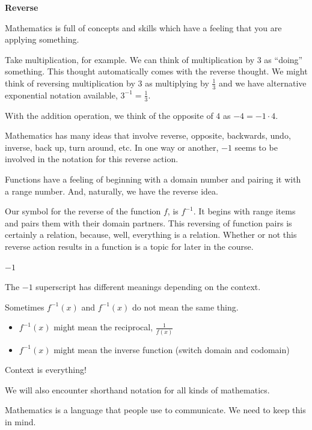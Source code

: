 \documentclass{ximera}
\begin{document}
\begin{notation} \textbf{\textcolor{red!50!green}{Reverse}}  

Mathematics is full of concepts and skills which have a feeling that you are applying something.

Take multiplication, for example.  We can think of multiplication by $3$ as ``doing'' something.  This thought automatically comes with the reverse thought.  We might think of reversing multiplication by $3$ as multiplying by $\frac{1}{3}$ and we have alternative exponential notation available, $3^{-1} = \frac{1}{3}$. 


With the addition operation, we think of the opposite of $4$ as $-4 = -1 \cdot 4$. 


Mathematics has many ideas that involve reverse, opposite, backwards, undo, inverse, back up, turn around, etc. In one way or another, $-1$ seems to be involved in the notation for this reverse action.  


Functions have a feeling of beginning with a domain number and pairing it with a range number.  And, naturally, we have the reverse idea. 

Our symbol for the reverse of the function $f$, is $f^{-1}$.  It begins with range items and pairs them with their domain partners.  This reversing of function pairs is certainly a relation, because, well, everything is a relation.  Whether or not this reverse action results in a function is a topic for later in the course.


\end{notation}



\begin{warning} \textbf{\textcolor{red!70!black}{$-1$}}


The $-1$ superscript has different meanings depending on the context. 


Sometimes $f^{-1}(x)$ and $f^{-1}(x)$ do not mean the same thing.


\begin{itemize}
\item $f^{-1}(x)$ might mean the reciprocal, $\frac{1}{f(x)}$
\item $f^{-1}(x)$ might mean the inverse function (switch domain and codomain)
\end{itemize}


Context is everything! 

We will also encounter shorthand notation for all kinds of mathematics. 

Mathematics is a language that people use to communicate.  We need to keep this in mind.


\end{warning}
\end{document}
